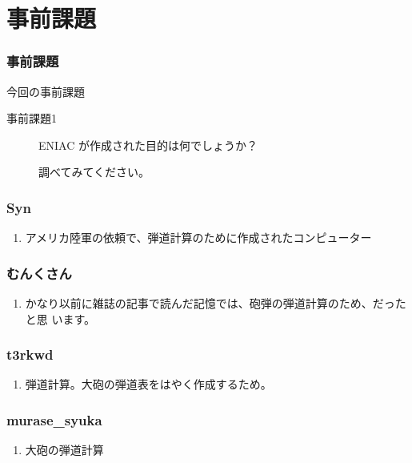 \documentclass[cjk,dvipdfmx,10pt,compress,%
hyperref={bookmarks=true,bookmarksnumbered=true,bookmarksopen=false,%
colorlinks=false,%
pdftitle={第 109 回 関西 Debian 勉強会},%
pdfauthor={倉敷・のがた・佐々木・かわだ},%
pdfsubject={資料},%
}]{beamer}
\begin{document}

\section{事前課題}

\begin{frame}[fragile]
  \frametitle{事前課題}
  \begin{block}{今回の事前課題}
    \begin{description}
    \item[事前課題1] ENIAC が作成された目的は何でしょうか？

      調べてみてください。
    \end{description}
  \end{block}
\end{frame}


\begin{frame}
  \frametitle{ Syn }
  \begin{enumerate}
  \item アメリカ陸軍の依頼で、弾道計算のために作成されたコンピューター
  \end{enumerate}
\end{frame}

\begin{frame}
  \frametitle{ むんくさん }
  \begin{enumerate}
  \item かなり以前に雑誌の記事で読んだ記憶では、砲弾の弾道計算のため、だったと思
    います。
  \end{enumerate}
\end{frame}

\begin{frame}
  \frametitle{ t3rkwd }
  \begin{enumerate}
  \item 弾道計算。大砲の弾道表をはやく作成するため。
  \end{enumerate}
\end{frame}

\begin{frame}
  \frametitle{ murase\_syuka }
  \begin{enumerate}
  \item 大砲の弾道計算
  \end{enumerate}
\end{frame}
\end{document}

